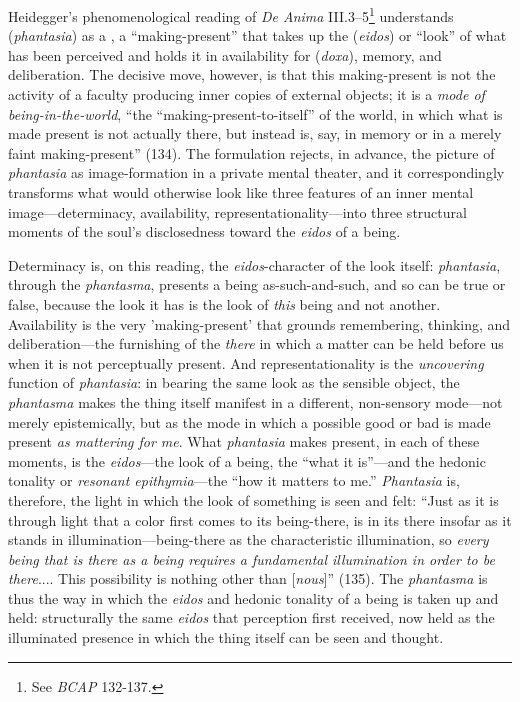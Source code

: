Heidegger's phenomenological reading of \textit{De Anima} III.3–5\footnote{See \textit{BCAP} 132-137.} understands  (\textit{phantasia}) as a , a ``making-present'' that takes up the  (\textit{eidos}) or ``look'' of what has been perceived and holds it in availability for  (\textit{doxa}), memory, and deliberation. The decisive move, however, is that this making-present is not the activity of a faculty producing inner copies of external objects; it is a \textit{mode of being-in-the-world}, ``the ``making-present-to-itself'' of the world, in which what is made present is not actually there, but instead is, say, in memory or in a merely faint making-present'' (134). The formulation rejects, in advance, the picture of \textit{phantasia} as image-formation in a private mental theater, and it correspondingly transforms what would otherwise look like three features of an inner mental image---determinacy, availability, representationality---into three structural moments of the soul's disclosedness toward the \textit{eidos} of a being.

Determinacy is, on this reading, the \textit{eidos}-character of the look itself: \textit{phantasia}, through the \textit{phantasma}, presents a being as-such-and-such, and so can be true or false, because the look it has is the look of \textit{this} being and not another. Availability is the very 'making-present' that grounds remembering, thinking, and deliberation---the furnishing of the \textit{there} in which a matter can be held before us when it is not perceptually present. And representationality is the \textit{uncovering} function of \textit{phantasia}: in bearing the same look as the sensible object, the \textit{phantasma} makes the thing itself manifest in a different, non-sensory mode---not merely epistemically, but as the mode in which a possible good or bad is made present \textit{as mattering for me}. What \textit{phantasia} makes present, in each of these moments, is the \textit{eidos}---the look of a being, the ``what it is''---and the hedonic tonality or \textit{resonant epithymia}---the ``how it matters to me.'' \textit{Phantasia} is, therefore, the light in which the look of something is seen and felt: ``Just as it is through light that a color first comes to its being-there, is in its there insofar as it stands in illumination---being-there as the characteristic illumination, so \textit{every being that is there as a being requires a fundamental illumination in order to be there}.... This possibility is nothing other than  [\textit{nous}]'' (135). The \textit{phantasma} is thus the way in which the \textit{eidos} and hedonic tonality of a being is taken up and held: structurally the same \textit{eidos} that perception first received, now held as the illuminated presence in which the thing itself can be seen and thought.

